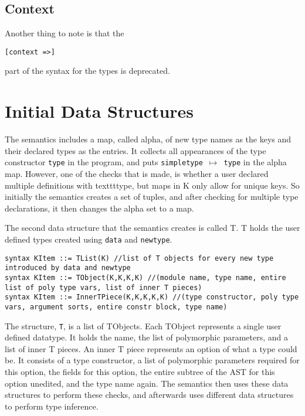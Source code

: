 \subsection{Context}
Another thing to note is that the
\begin{lstlisting}
[context =>]
\end{lstlisting}
part of the syntax for the types is deprecated. \cite{Stack:Depre}

\section{Initial Data Structures}

The semantics includes a map, called alpha, of new type names as the keys and their declared types as the entries. It collects all appearances of the type constructor \texttt{type} in the program, and puts \texttt{simpletype $\mapsto$ type} in the alpha map. However, one of the checks that is made, is whether a user declared multiple definitions with texttt{type}, but maps in K only allow for unique keys. So initially the semantics creates a set of tuples, and after checking for multiple type declarations, it then changes the alpha set to a map.


The second data structure that the semantics creates is called T. T holds the user defined types created using \texttt{data} and \texttt{newtype}.

\begin{lstlisting}
syntax KItem ::= TList(K) //list of T objects for every new type introduced by data and newtype
syntax KItem ::= TObject(K,K,K,K) //(module name, type name, entire list of poly type vars, list of inner T pieces)
syntax KItem ::= InnerTPiece(K,K,K,K,K) //(type constructor, poly type vars, argument sorts, entire constr block, type name)
\end{lstlisting}

The structure, \texttt{T}, is a list of TObjects. Each TObject represents a single user defined datatype. It holds the name, the list of polymorphic parameters, and a list of inner T pieces.
An inner T piece represents an option of what a type could be. It consists of a type constructor, a list of polymorphic parameters required for this option, the fields for this option, the entire subtree of the AST for this option unedited, and the type name again.
The semantics then uses these data structures to perform these checks, and afterwards uses different data structures to perform type inference.

